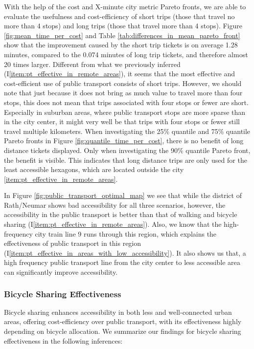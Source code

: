 With the help of the cost and X-minute city metric Pareto fronts, we are able to evaluate the usefulness and cost-efficiency of short trips (those that travel no more than 4 stops) and long trips (those that travel more than 4 stops).
Figure \ref{fig:mean_time_per_cost} and Table \ref{tab:differences_in_mean_pareto_front} show that the improvement caused by the short trip tickets is on average 1.28 minutes, compared to the 0.074 minutes of long trip tickets, and therefore almost 20 times larger.
Different from what we previously inferred (I\ref{item:pt_effective_in_remote_areas}), it seems that the most effective and cost-efficient use of public transport consists of short trips.
However, we should note that just because it does not bring as much value to travel more than four stops, this does not mean that trips associated with four stops or fewer are short.
Especially in suburban areas, where public transport stops are more sparse than in the city center, it might very well be that trips with four stops or fewer still travel multiple kilometers.
When investigating the 25\% quantile and 75\% quantile Pareto fronts in Figure \ref{fig:quantile_time_per_cost}, there is no benefit of long distance tickets displayed.
Only when investigating the 90\% quantile Pareto front, the benefit is visible.
This indicates that long distance trips are only used for the least accessible hexagons, which are located outside the city \ref{item:pt_effective_in_remote_areas}.

In Figure \ref{fig:public_transport_optimal_map} we see that while the district of Rath/Neumar shows bad accessibility for all three scenarios, however, the accessibility in the public transport is better than that of walking and bicycle sharing (I\ref{item:pt_effective_in_remote_areas}).
Also, we know that the high-frequency city train line 9 runs through this region, which explains the effectiveness of public transport in this region (I\ref{item:pt_effective_in_areas_with_low_accessibility}).
It also shows us that, a high frequency public transport line from the city center to less accessible area can significantly improve accessibility.

\subsubsection{Bicycle Sharing Effectiveness}
Bicycle sharing enhances accessibility in both less and well-connected urban areas, offering cost-efficiency over public transport, with its effectiveness highly depending on bicycle allocation.
We summarize our findings for bicycle sharing effectiveness in the following inferences:

